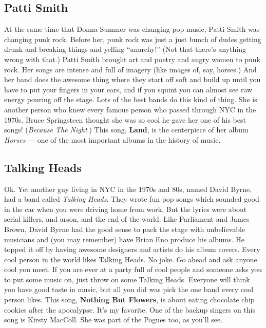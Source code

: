 \documentclass[letterpaper,]{article}
\begin{document}
\hypertarget{patti-smith}{%
\subsection{Patti Smith}\label{patti-smith}}

At the same time that Donna Summer was changing pop music, Patti Smith
was changing punk rock. Before her, punk rock was just a just bunch of
dudes getting drunk and breaking things and yelling ``anarchy!'' (Not
that there's anything wrong with that.) Patti Smith brought art and
poetry and angry women to punk rock. Her songs are intense and full of
imagery (like images of, say, horses.) And her band does the awesome
thing where they start off soft and build up until you have to put your
fingers in your ears, and if you squint you can almost see raw energy
pouring off the stage. Lots of the best bands do this kind of thing. She
is another person who knew every famous person who passed through NYC in
the 1970s. Bruce Springsteen thought she was so cool he gave her one of
his best songs! (\emph{Because The Night}.) This song, \textbf{Land}, is
the centerpiece of her album \emph{Horses} --- one of the most important
albums in the history of music.

\hypertarget{talking-heads}{%
\subsection{Talking Heads}\label{talking-heads}}

Ok. Yet another guy living in NYC in the 1970s and 80s, named David
Byrne, had a band called \emph{Talking Heads}. They wrote fun pop songs
which sounded good in the car when you were driving home from work. But
the lyrics were about serial killers, and arson, and the end of the
world. Like Parliament and James Brown, David Byrne had the good sense
to pack the stage with unbelievable musicians and (you may remember)
have Brian Eno produce his albums. He topped it off by having awesome
designers and artists do his album covers. Every cool person in the
world likes Talking Heads. No joke. Go ahead and ask anyone cool you
meet. If you are ever at a party full of cool people and someone asks
you to put some music on, just throw on some Talking Heads. Everyone
will think you have good taste in music, but all you did was pick the
one band every cool person likes. This song, \textbf{Nothing But
Flowers}, is about eating chocolate chip cookies after the apocalypse.
It's my favorite. One of the backup singers on this song is Kirsty
MacColl. She was part of the Pogues too, as you'll see.
\end{document}
